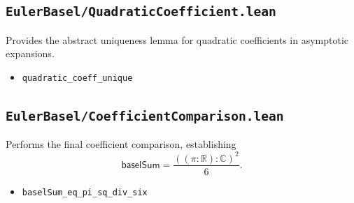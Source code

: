 \documentclass[11pt,a4paper]{article}
\theoremstyle{plain}
\theoremstyle{definition}
\DeclareRobustCommand{\codepath}[1]{\nolinkurl{#1}}
\DeclareRobustCommand{\codepath}[1]{\nolinkurl{#1}}
\newcommand{\baselSum}{\ensuremath{\mathsf{baselSum}}}
\begin{document}
\subsection*{\codepath{EulerBasel/QuadraticCoefficient.lean}}

Provides the abstract uniqueness lemma for quadratic coefficients in
asymptotic expansions.

\begin{itemize}[leftmargin=2em]
  \item \texttt{quadratic\_coeff\_unique}
\end{itemize}


\subsection*{\codepath{EulerBasel/CoefficientComparison.lean}}

Performs the final coefficient comparison, establishing
\[
\baselSum = \frac{((\pi : \mathbb{R}) : \mathbb{C})^{2}}{6}.
\]

\begin{itemize}[leftmargin=2em]
  \item \texttt{baselSum\_eq\_pi\_sq\_div\_six}
\end{itemize}

\printbibliography
\end{document}
